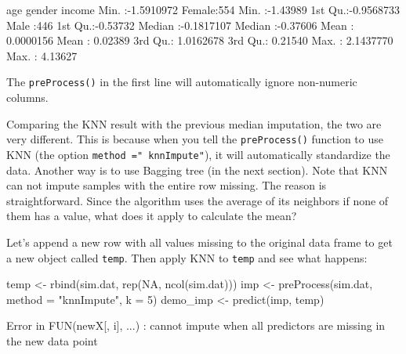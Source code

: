 \documentclass[
  12pt,
]{krantz}
\makeatletter
\newenvironment{Shaded}{\begin{snugshade}}{\end{snugshade}}
\newcommand{\AttributeTok}[1]{\textcolor[rgb]{0.61,0.61,0.61}{#1}}
\newcommand{\ConstantTok}[1]{\textcolor[rgb]{0,0,0}{#1}}
\newcommand{\DecValTok}[1]{\textcolor[rgb]{0.06,0.06,0.06}{#1}}
\newcommand{\FunctionTok}[1]{\textcolor[rgb]{0,0,0}{#1}}
\newcommand{\NormalTok}[1]{#1}
\newcommand{\OtherTok}[1]{\textcolor[rgb]{0.37,0.37,0.37}{#1}}
\newcommand{\StringTok}[1]{\textcolor[rgb]{0.5,0.5,0.5}{#1}}
\newenvironment{kframe}{%
\medskip{}
\setlength{\fboxsep}{.8em}
 \def\at@end@of@kframe{}%
 \ifinner\ifhmode%
  \def\at@end@of@kframe{\end{minipage}}%
  \begin{minipage}{\columnwidth}%
 \fi\fi%
 \def\FrameCommand##1{\hskip\@totalleftmargin \hskip-\fboxsep
 \colorbox{shadecolor}{##1}\hskip-\fboxsep
     \hskip-\linewidth \hskip-\@totalleftmargin \hskip\columnwidth}%
 \MakeFramed {\advance\hsize-\width
   \@totalleftmargin\z@ \linewidth\hsize
   \@setminipage}}%
 {\par\unskip\endMakeFramed%
 \at@end@of@kframe}
\renewenvironment{Shaded}{\begin{kframe}}{\end{kframe}}
\makeatother
\begin{document}
\begin{Shaded}
\begin{Highlighting}[]
\NormalTok{      age                gender        income        }
\NormalTok{ Min.   :{-}1.5910972   Female:554   Min.   :{-}1.43989  }
\NormalTok{ 1st Qu.:{-}0.9568733   Male  :446   1st Qu.:{-}0.53732  }
\NormalTok{ Median :{-}0.1817107                Median :{-}0.37606  }
\NormalTok{ Mean   : 0.0000156                Mean   : 0.02389  }
\NormalTok{ 3rd Qu.: 1.0162678                3rd Qu.: 0.21540  }
\NormalTok{ Max.   : 2.1437770                Max.   : 4.13627 }
\end{Highlighting}
\end{Shaded}

The \texttt{preProcess()} in the first line will automatically ignore non-numeric columns.

Comparing the KNN result with the previous median imputation, the two are very different. This is because when you tell the \texttt{preProcess()} function to use KNN (the option \texttt{method\ ="\ knnImpute"}), it will automatically standardize the data.
Another way is to use Bagging tree (in the next section). Note that KNN can not impute samples with the entire row missing. The reason is straightforward. Since the algorithm uses the average of its neighbors if none of them has a value, what does it apply to calculate the mean?

Let's append a new row with all values missing to the original data frame to get a new object called \texttt{temp}. Then apply KNN to \texttt{temp} and see what happens:

\begin{Shaded}
\begin{Highlighting}[]
\NormalTok{temp }\OtherTok{\textless{}{-}} \FunctionTok{rbind}\NormalTok{(sim.dat, }\FunctionTok{rep}\NormalTok{(}\ConstantTok{NA}\NormalTok{, }\FunctionTok{ncol}\NormalTok{(sim.dat)))}
\NormalTok{imp }\OtherTok{\textless{}{-}} \FunctionTok{preProcess}\NormalTok{(sim.dat, }\AttributeTok{method =} \StringTok{"knnImpute"}\NormalTok{, }\AttributeTok{k =} \DecValTok{5}\NormalTok{)}
\NormalTok{demo\_imp }\OtherTok{\textless{}{-}} \FunctionTok{predict}\NormalTok{(imp, temp)}
\end{Highlighting}
\end{Shaded}

\begin{Shaded}
\begin{Highlighting}[]
\NormalTok{Error in FUN(newX[, i], ...) : }
\NormalTok{  cannot impute when all predictors are missing in the new data point}
\end{Highlighting}
\end{Shaded}
\end{document}
